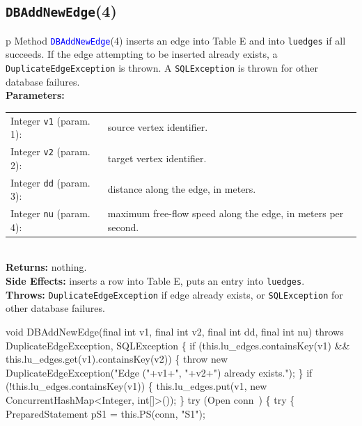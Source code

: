 \subsection{\texttt{DBAddNewEdge}(4)}
\begin{tabular}{p{\textwidth}}
\toprule
{}
Method \textcolor{blue}{{\tt{}\protect{}DBAddNewEdge}}(4) inserts an edge into Table E
and into {\tt{}lu{}edges} if all succeeds. If the edge attempting to be inserted
already exists, a {\tt{}DuplicateEdgeException} is thrown. A {\tt{}SQLException}
is thrown for other database failures.\\
\midrule
\textbf{Parameters:} \\
\begin{tabular}{lp{116mm}}
Integer {\tt{}v1} (param. 1):&source vertex identifier.\\
Integer {\tt{}v2} (param. 2):&target vertex identifier.\\
Integer {\tt{}dd} (param. 3):&distance along the edge, in meters.\\
Integer {\tt{}nu} (param. 4):&maximum free-flow speed along the edge, in meters per second.\\
\end{tabular}\\
\textbf{Returns:} nothing.\\
\textbf{Side Effects:} inserts a row into Table E, puts an entry into
{\tt{}lu{}edges}.\\
\textbf{Throws:} {\tt{}DuplicateEdgeException} if edge already exists, or
{\tt{}SQLException} for other database failures.\\
\bottomrule
\end{tabular}
\nwenddocs{}\endmoddef{}
void DBAddNewEdge(final int v1, final int v2, final int dd, final int nu)
throws DuplicateEdgeException, SQLException \{
  if (this.lu_edges.containsKey(v1) && this.lu_edges.get(v1).containsKey(v2)) \{
    throw new DuplicateEdgeException("Edge ("+v1+", "+v2+") already exists.");
  \}
  if (!this.lu_edges.containsKey(v1)) \{
    this.lu_edges.put(v1, new ConcurrentHashMap<Integer, int[]>());
  \}
  try (\LA{}Open \code{}conn\edoc{}~{\nwtagstyle{}}\RA{}) \{
    try \{
      PreparedStatement pS1 = this.PS(conn, "S1");

